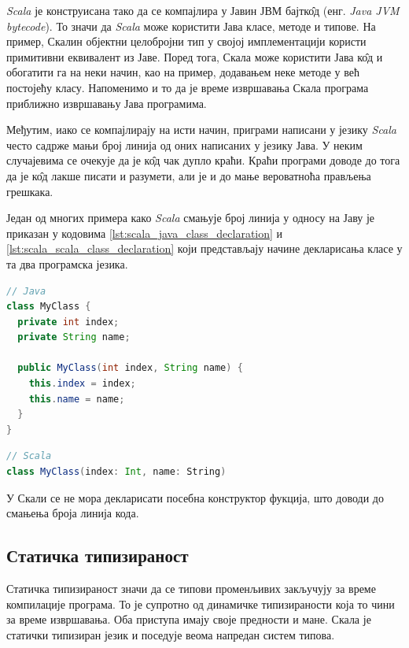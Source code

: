 \documentclass[12pt,oneside]{memoir}
\begin{document}
\textit{Scala} је конструисана тако да се компајлира у Јавин ЈВМ бајтк\^{о}д (енг. \textit{Java JVM bytecode}). То значи да \textit{Scala} може користити Јава класе, методе и типове. На пример, Скалин објектни целобројни тип у својој имплементацији користи примитивни еквивалент из Јаве. Поред тога, Скала може користити Јава к\^{о}д и обогатити га на неки начин, као на пример, додавањем неке методе у већ постојећу класу. Напоменимо и то да је време извршавања Скала програма приближно извршавању Јава програмима. \cite{scala_prog}

Међутим, иако се компајлирају на исти начин, приграми написани у језику \textit{Scala} често садрже мањи број линија од оних написаних у језику Јава. У неким случајевима се очекује да је к\^{о}д чак дупло краћи. Краћи програми доводе до тога да је к\^{о}д лакше писати и разумети, али је и до мање вероватноћа прављења грешкака. \cite{scala_prog}

Један од многих примера како \textit{Scala} смањује број линија у односу на Јаву је приказан у кодовима \ref{lst:scala_java_class_declaration} и \ref{lst:scala_scala_class_declaration} који представљају начине декларисања класе у та два програмска језика.

\begin{lstlisting}[caption={Декларација класе у језику Јава}, language=Java, label={lst:scala_java_class_declaration}]
// Java
class MyClass {  
  private int index;
  private String name;
  
  public MyClass(int index, String name) {
    this.index = index;
    this.name = name;
  }
}
\end{lstlisting}

\begin{lstlisting}[caption={Декларација класе у језику Scala}, language=Scala, label={lst:scala_scala_class_declaration}]
// Scala
class MyClass(index: Int, name: String)

\end{lstlisting}

У Скали се не мора декларисати посебна конструктор фукција, што доводи до смањења броја линија кода. \cite{scala_prog}

\subsection{Статичка типизираност}
\label{subsec:scala_stat_tip}

Статичка типизираност значи да се типови променљивих закључују за време компилације програма. То је супротно од динамичке типизираности која то чини за време извршавања. Оба приступа имају своје предности и мане. Скала је статички типизиран језик и поседује веома напредан систем типова.
\end{document}
